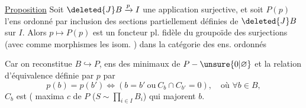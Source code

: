 \uline{Proposition} Soit \(\deleted{J}B\xrightarrow{p} I\) une application surjective, et soit \(P(p)\) l'ens ordonné par inclusion des sections partiellement définies de \(\deleted{J}B\) sur \(I\). Alors \(p\longmapsto P(p)\) est un foncteur pl. fidèle du groupoïde des surjections (avec comme  morphismes les isom.
) dans la catégorie des ens. ordonnés

Car on reconstitue \(B\hookrightarrow P\), ens des  minimaux de \(P-\unsure{0|\varnothing}\)\deleted{\unsure{\(\}\)}}  et la relation d'équivalence définie par \(p\) par
\[p(b)=p(b')\Longleftrightarrow(b=b'\ \text{ou}\ C_b\cap C_{b'}=0),\quad\text{où }\forall b\in B,\]
\(C_b\) est   ( maxima \(c\) de \(P\) (\(S\sim\prod_{i\in I} B_i\))  qui majorent \(b\).

